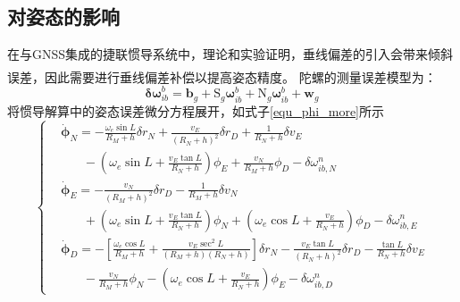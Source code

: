 \documentclass[12pt,a4,utf8]{article}
\newcommand{\upcite}[1]{\textsuperscript{\textsuperscript{\cite{#1}}}} %
\newcommand{\bmmathrm}[1]{\bm{\mathrm{#1}}}
\begin{document}
\subsection{对姿态的影响}
在与GNSS集成的捷联惯导系统中，理论和实验证明，垂线偏差的引入会带来倾斜误差，因此需要进行垂线偏差补偿以提高姿态精度\upcite{grejner1998gravity,dai2015dynamic}。
陀螺的测量误差模型为：
\begin{equation}
      \bm{\delta \omega}^b_{ib} = \bm{b}_g + \bmmathrm{S}_g \bm{\omega}^b_{ib} + \bmmathrm{N}_g \bm{\omega}^b_{ib} + \bm{w}_g
      \label{gyro_bias}
\end{equation}
将惯导解算中的姿态误差微分方程展开，如式子\ref{equ_phi_more}所示
\begin{equation}
            \left\{ \begin{aligned}
            & \dot{\bm{\phi}}_N=-\frac{\omega_e\sin L}{R_M + h}\delta r_N+\frac{v_E}{(R_N+h)^2}\delta r_D + \frac{1}{R_N + h}\delta v_E \\
            & \ \ \ \ \ \ \ \ - \left ( \omega_e\sin L + \frac{v_E\tan L}{R_N +h} \right )\phi_E + \frac{v_N}{R_M+h}\phi_D - \delta \omega^n_{ib,N} \\ 
            & \dot{\bm{\phi}}_E= - \frac{v_N}{(R_M + h)^2}\delta r_D - \frac{1}{R_M + h }\delta v_N \\
            & \ \ \ \ \ \ \ \ + \left ( \omega_e \sin L + \frac{v_E\tan L}{R_N + h} \right )\phi_N + \left ( \omega_e \cos L +\frac{v_E}{R_N + h} \right )\phi_D - \delta \omega^n_{ib,E}\\ 
            & \dot{\bm{\phi}}_D= - \left [ \frac{\omega_e\cos L}{R_M + h}+ \frac{v_E\sec ^2L}{(R_M + h)(R_N + h)}\right ]\delta r_N - \frac{v_E \tan L}{(R_N+h)^2}\delta r_D - \frac{\tan L}{R_N + h}\delta v_E \\
            & \ \ \ \ \ \ \ \ - \frac{v_N}{R_M + h}\phi_N - \left ( \omega_e \cos L + \frac{v_E}{R_N + h } \right )\phi_E - \delta \omega^n_{ib,D}
      \end{aligned} \right.
      \label{equ_phi_more}
\end{equation}
\end{document}
